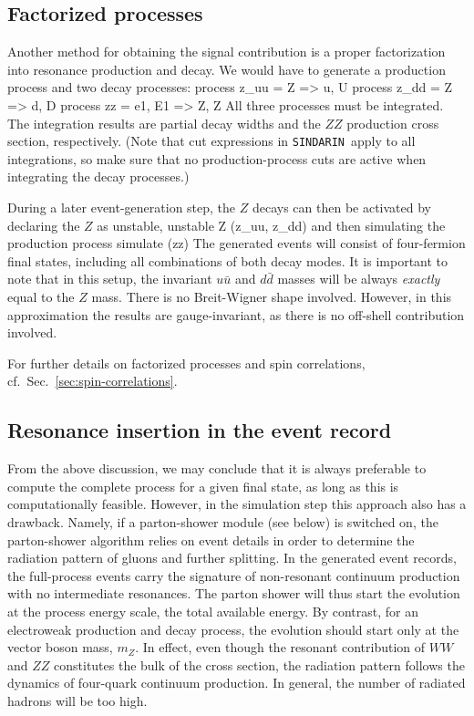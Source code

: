 \documentclass[12pt]{book}
\newenvironment{Code}%
  {\begingroup\footnotesize
   \quote
   \Verbatim[frame=single]}%
  {\endVerbatim
   \endquote
   \endgroup\noindent}
\newcommand{\ttt}[1]{\texttt{#1}}
\newcommand{\sindarin}{\ttt{SINDARIN}}
\begin{document}
\subsection{Factorized processes}

Another method for obtaining the signal contribution is a proper factorization
into resonance production and decay.  We would have to generate a production
process and two decay processes:
\begin{Code}
        process z_uu = Z => u, U
        process z_dd = Z => d, D
        process zz = e1, E1 => Z, Z
\end{Code}
All three processes must be integrated.  The integration results are partial
decay widths and the $ZZ$ production cross section, respectively.  (Note that
cut expressions in \sindarin\ apply to all integrations, so make sure that
no production-process cuts are active when integrating the decay
processes.)

During a later event-generation step, the $Z$ decays can then be activated by declaring the $Z$ as
unstable,
\begin{Code}
        unstable Z (z_uu, z_dd)
\end{Code}
and then simulating the production process
\begin{Code}
        simulate (zz)
\end{Code}
The generated events will consist of four-fermion final states, including all
combinations of both decay modes.  It is important to note that in this setup,
the invariant $u\bar u$ and $d\bar d$ masses will be always \emph{exactly}
equal to the $Z$ mass.  There is no Breit-Wigner shape involved.  However, in
this approximation the results are gauge-invariant, as there is no off-shell
contribution involved.

For further details on factorized processes and spin correlations,
cf.\ Sec.~\ref{sec:spin-correlations}.


\subsection{Resonance insertion in the event record}

From the above discussion, we may conclude that it is always preferable to
compute the complete process for a given final state, as long as this is
computationally feasible.  However, in the simulation step this approach also
has a drawback.  Namely, if a parton-shower module (see below) is switched on,
the parton-shower algorithm relies on event details in order to determine the
radiation pattern of gluons and further splitting.  In the generated event
records, the full-process events carry the signature of non-resonant continuum
production with no intermediate resonances.  The parton shower will thus start
the evolution at the process energy scale, the total available energy.  By
contrast, for an electroweak production and decay process, the evolution
should start only at the vector boson mass, $m_Z$.  In effect, even though the
resonant contribution of $WW$ and $ZZ$ constitutes the bulk of the cross
section, the radiation pattern follows the dynamics of four-quark continuum
production.  In general, the number of radiated hadrons will be too high.
\end{document}
